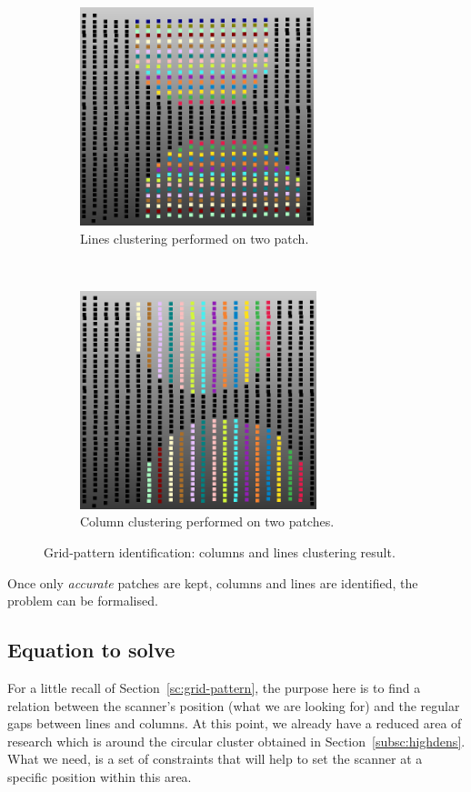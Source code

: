 \begin{figure}[t!]
  \centering
    \begin{subfigure}[t]{0.5\textwidth}
      \centering
        \includegraphics[height=2.5in]{img/grid-lines.png}
        \caption{Lines clustering performed on two patch.}
    \end{subfigure}%
    ~
    \begin{subfigure}[t]{0.5\textwidth}
      \centering
        \includegraphics[height=2.5in]{img/grid-cols.png}
        \caption{Column clustering performed on two patches.}
    \end{subfigure}
    \caption{Grid-pattern identification: columns and lines clustering result.}
    \label{fig:line-col-cluster}
\end{figure}

Once only \emph{accurate} patches are kept, columns and lines are identified, the problem can be formalised.

\subsection{Equation to solve}
\label{subsc:eq}

For a little recall of Section~\ref{sc:grid-pattern}, the purpose here is to find a relation between the scanner's position (what we are looking for) and the regular gaps between lines and columns. At this point, we already have a reduced area of research which is around the circular cluster obtained in Section~\ref{subsc:highdens}. What we need, is a set of constraints that will help to set the scanner at a specific position within this area.

